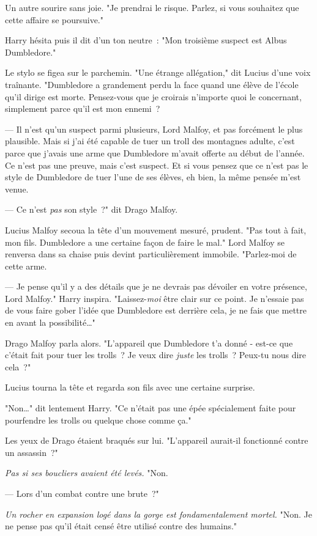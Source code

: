 Un autre sourire sans joie. "Je prendrai le risque. Parlez, si vous souhaitez que cette affaire se poursuive."

Harry hésita puis il dit d'un ton neutre~: "Mon troisième suspect est Albus Dumbledore."

Le stylo se figea sur le parchemin. "Une étrange allégation," dit Lucius d'une voix traînante. "Dumbledore a grandement perdu la face quand une élève de l'école qu'il dirige est morte. Pensez-vous que je croirais n'importe quoi le concernant, simplement parce qu'il est mon ennemi~?

--- Il n'est qu'un suspect parmi plusieurs, Lord Malfoy, et pas forcément le plus plausible. Mais si j'ai été capable de tuer un troll des montagnes adulte, c'est parce que j'avais une arme que Dumbledore m'avait offerte au début de l'année. Ce n'est pas une preuve, mais c'est suspect. Et si vous pensez que ce n'est pas le style de Dumbledore de tuer l'une de ses élèves, eh bien, la même pensée m'est venue.

--- Ce n'est \emph{pas} son style~?" dit Drago Malfoy.

Lucius Malfoy secoua la tête d'un mouvement mesuré, prudent. "Pas tout à fait, mon fils. Dumbledore a une certaine façon de faire le mal." Lord Malfoy se renversa dans sa chaise puis devint particulièrement immobile. "Parlez-moi de cette arme.

--- Je pense qu'il y a des détails que je ne devrais pas dévoiler en votre présence, Lord Malfoy." Harry inspira. "Laissez-\emph{moi} être clair sur ce point. Je n'essaie pas de vous faire gober l'idée que Dumbledore est derrière cela, je ne fais que mettre en avant la possibilité…"

Drago Malfoy parla alors. "L'appareil que Dumbledore t'a donné - est-ce que c'était fait pour tuer les trolls~? Je veux dire \emph{juste} les trolls~? Peux-tu nous dire cela~?"

Lucius tourna la tête et regarda son fils avec une certaine surprise.

"Non…" dit lentement Harry. "Ce n'était pas une épée spécialement faite pour pourfendre les trolls ou quelque chose comme ça."

Les yeux de Drago étaient braqués sur lui. "L'appareil aurait-il fonctionné contre un assassin~?"

\emph{Pas si ses boucliers avaient été levés.} "Non.

--- Lors d'un combat contre une brute~?"

\emph{Un rocher en expansion logé dans la gorge est fondamentalement mortel.} "Non. Je ne pense pas qu'il était censé être utilisé contre des humains."

